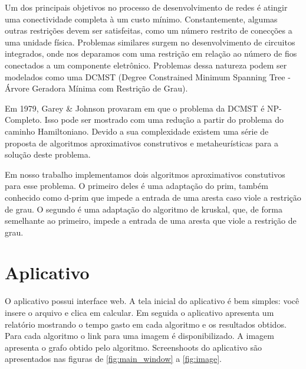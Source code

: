 \documentclass[12pt,a4paper]{article}
\begin{document}

Um dos principais objetivos no processo de desenvolvimento de redes é atingir
uma conectividade completa à um custo mínimo. Constantemente, algumas outras
restrições devem ser satisfeitas, como um número restrito de conecções a uma
unidade física. Problemas similares surgem no desenvolvimento de circuitos
integrados, onde nos deparamos com uma restrição em relação ao número de fios
conectados a um componente eletrônico. Problemas dessa natureza podem ser
modelados como uma DCMST (Degree Constrained Minimum Spanning Tree - Árvore
Geradora Mínima com Restrição de Grau)\cite{behle2007primal}.

Em 1979, Garey \& Johnson provaram em \cite{garey1979computers} que o problema
da DCMST é NP-Completo. Isso pode ser mostrado com uma redução a partir do
problema do caminho Hamiltoniano. Devido a sua complexidade existem uma série de
proposta de algoritmos aproximativos construtivos e metaheurísticas para a
solução deste problema.

Em nosso trabalho implementamos dois algoritmos aproximativos constutivos para
esse problema. O primeiro deles é uma adaptação do prim, também conhecido como
d-prim que impede a entrada de uma aresta caso viole a restrição de
grau\cite{narula1980degree}. O segundo é uma adaptação do algoritmo de kruskal,
que, de forma semelhante ao primeiro, impede a entrada de uma aresta que viole a
restrição de grau.

\section{Aplicativo}
O aplicativo possui interface web. A tela inicial do aplicativo é bem simples:
você insere o arquivo e clica em calcular. Em seguida o aplicativo apresenta um
relatório mostrando o tempo gasto em cada algoritmo e os resultados obtidos.
Para cada algoritmo o link para uma imagem é disponibilizado. A imagem apresenta
o grafo obtido pelo algoritmo. Screenshoots do aplicativo são apresentados nas
figuras de \ref{fig:main_window} a \ref{fig:image}.
\end{document}
